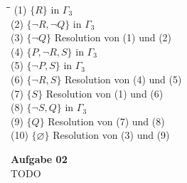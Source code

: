 \documentclass[a4paper,10pt]{article}
\begin{document}
\begin{compactenum} [(a)]
\begin{compactitem}
			\begin{tabbing}
				\= \qquad \= \qquad\qquad\qquad \= \qquad\qquad \kill
				\>(1) \> $ \{R\} $ \> in $ \Gamma_3 $ \\
				\>(2) \> $ \{\lnot R, \lnot Q\} $ \> in $ \Gamma_3 $ \\
				\>(3) \> $ \{\lnot Q \} $ \> Resolution von (1) und (2) \\
				\>(4) \> $ \{P ,\lnot R, S\} $ \> in $ \Gamma_3 $\\
				\>(5) \> $ \{\lnot P, S\} $ \> in $ \Gamma_3 $ \\
				\>(6) \> $ \{\lnot R, S\} $ \> Resolution von (4) und (5) \\
				\>(7) \> $ \{S\} $ \> Resolution von (1) und (6) \\
				\>(8) \> $ \{\lnot S, Q\} $ \> in $ \Gamma_3 $ \\
				\>(9) \> $ \{Q\} $ \> Resolution von (7) und (8) \\
				\>(10) \> $ \{\varnothing\} $ \> Resolution von (3) und (9) \\
			\end{tabbing}
		\end{compactitem}
	\end{compactenum}
	\textbf{Aufgabe 02} \\
	TODO
\end{document}

